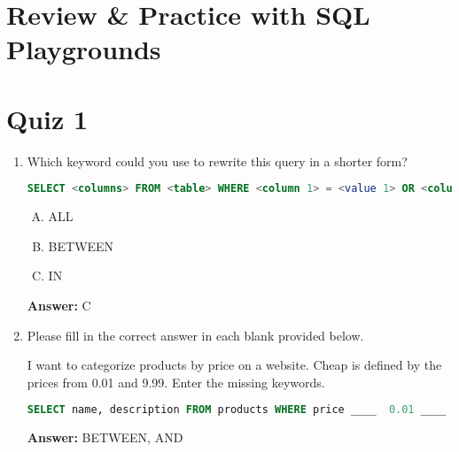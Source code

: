 \documentclass[12pt]{article}
\begin{document}
\bigskip

\section{Review \& Practice with SQL Playgrounds}

\bigskip

\section{Quiz 1}

\bigskip

\begin{enumerate}[1.]
    \item

    Which keyword could you use to rewrite this query in a shorter form?

    \bigskip

    \begin{lstlisting}[language=SQL]
    SELECT <columns> FROM <table> WHERE <column 1> = <value 1> OR <column 1> = <value 2> OR <column 1> = <value 3>;
    \end{lstlisting}

    \begin{enumerate}[A.]
        \item ALL
        \item BETWEEN
        \item IN
    \end{enumerate}

    \bigskip

    \textbf{Answer:} C

    \item

    Please fill in the correct answer in each blank provided below.

    \bigskip

    I want to categorize products by price on a website. Cheap is defined by the
    prices from 0.01 and 9.99. Enter the missing keywords.

    \bigskip

    \begin{lstlisting}[language=SQL]
    SELECT name, description FROM products WHERE price ____  0.01 ____ 9.99;
    \end{lstlisting}

    \bigskip

    \textbf{Answer:} BETWEEN, AND

\end{enumerate}
\end{document}
